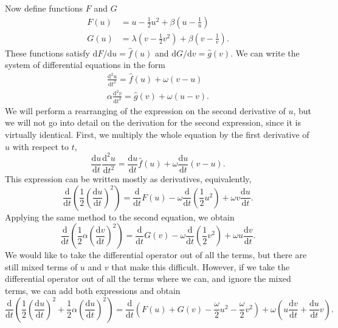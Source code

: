 Now define functions $F$ and $G$
\begin{align*}
    F(u) &= u - \frac{1}{2}u^2 + \beta\left(u - \frac{1}{u} \right) \\
    G(u) &= \lambda\left( v - \frac{1}{2}v^2 \right) + \beta\left( v - \frac{1}{v}\right).
\end{align*}
These functions satisfy \(\mathrm{d}F/\mathrm{d}u = \hat{f}(u)\) and \(\mathrm{d}G/\mathrm{d}v = \hat{g}(v)\).
We can write the system of differential equations in the form
\begin{align*}
    \frac{\mathrm{d}^2 u}{\mathrm{d}t^2} = \hat{f}(u) + \omega(v-u) \\
    \alpha\frac{\mathrm{d}^2 v}{\mathrm{d}t^2} = \hat{g}(v) + \omega(u-v).
\end{align*}
We will perform a rearranging of the expression on the second derivative of $u$,
but we will not go into detail on the derivation for the second expression,
since it is virtually identical.
First, we multiply the whole equation by the first derivative of $u$ with respect to $t$,
\begin{equation*}
    \frac{\mathrm{d}u}{\mathrm{d}t}\frac{\mathrm{d}^2 u}{\mathrm{d}t^2} = \frac{\mathrm{d}u}{\mathrm{d}t}\hat{f}(u) + \omega \frac{\mathrm{d}u}{\mathrm{d}t}(v-u).
\end{equation*}
This expression can be written mostly as derivatives, equivalently,
\begin{equation*}
    \frac{\mathrm{d}}{\mathrm{d}t}\left(
        \frac{1}{2}\left(\frac{\mathrm{d}u}{\mathrm{d}t}\right)^2
     \right) = \frac{\mathrm{d}}{\mathrm{d}t}F(u) - \omega\frac{\mathrm{d}}{\mathrm{d}t}\left(\frac{1}{2}u^2\right) + \omega v \frac{\mathrm{d}u}{\mathrm{d}t}.
\end{equation*}
Applying the same method to the second equation, we obtain
\begin{equation*}
    \frac{\mathrm{d}}{\mathrm{d}t}\left(
        \frac{1}{2}\alpha\left(\frac{\mathrm{d}v}{\mathrm{d}t}\right)^2
    \right) = \frac{\mathrm{d}}{\mathrm{d}t}G(v) - \omega\frac{\mathrm{d}}{\mathrm{d}t}\left( \frac{1}{2}v^2 \right) + \omega u \frac{\mathrm{d}v}{\mathrm{d}t}.
\end{equation*}
We would like to take the differential operator out of all the terms, but there are still mixed terms of $u$ and $v$ that make this difficult.
However, if we take the differential operator out of all the terms where we can, and ignore the mixed terms, we can add both expressions and obtain
\begin{equation*}
    \frac{\mathrm{d}}{\mathrm{d}t}\left(
        \frac{1}{2}\left(\frac{\mathrm{d}u}{\mathrm{d}t}\right)^2 + \frac{1}{2}\alpha\left(\frac{\mathrm{d}u}{\mathrm{d}t}\right)^2
    \right) = \frac{\mathrm{d}}{\mathrm{d}t}\left(
        F(u) + G(v) - \frac{\omega}{2}u^2 -\frac{\omega}{2}v^2
    \right) + \omega \left(
        u \frac{\mathrm{d}v}{\mathrm{d}t} + \frac{\mathrm{d}u}{\mathrm{d}t}v
    \right).
\end{equation*}
